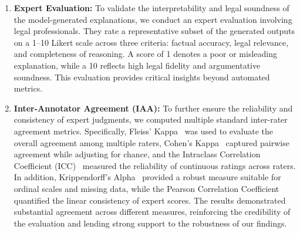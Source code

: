 \begin{enumerate}


    \item \textbf{Expert Evaluation:} To validate the interpretability and legal soundness of the model-generated explanations, we conduct an expert evaluation involving legal professionals. They rate a representative subset of the generated outputs on a 1–10 Likert scale across three criteria: factual accuracy, legal relevance, and completeness of reasoning. A score of 1 denotes a poor or misleading explanation, while a 10 reflects high legal fidelity and argumentative soundness. This evaluation provides critical insights beyond automated metrics.

    \item \textbf{Inter-Annotator Agreement (IAA):} To further ensure the reliability and consistency of expert judgments, we computed multiple standard inter-rater agreement metrics. Specifically, Fleiss’ Kappa~\cite{fleiss1971measuring} was used to evaluate the overall agreement among multiple raters, Cohen’s Kappa~\cite{cohen1960coefficient} captured pairwise agreement while adjusting for chance, and the Intraclass Correlation Coefficient (ICC)~\cite{shrout1979intraclass} measured the reliability of continuous ratings across raters. In addition, Krippendorff’s Alpha~\cite{krippendorff2018content} provided a robust measure suitable for ordinal scales and missing data, while the Pearson Correlation Coefficient~\cite{benesty2009pearson} quantified the linear consistency of expert scores. The results demonstrated substantial agreement across different measures, reinforcing the credibility of the evaluation and lending strong support to the robustness of our findings.
\end{enumerate}

